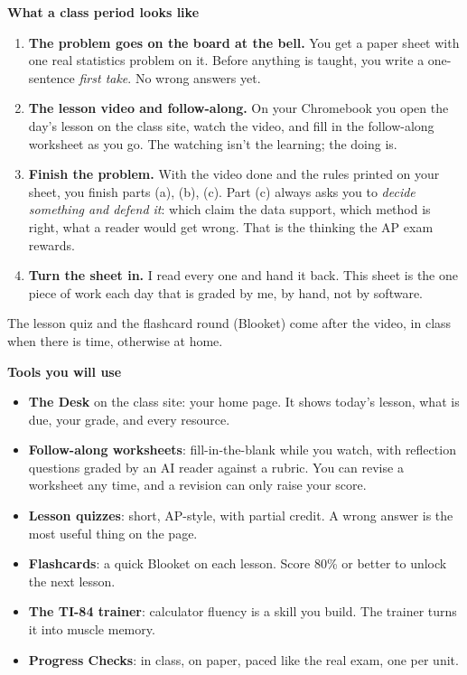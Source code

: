 \documentclass[10pt]{article}
\newcommand{\banner}[1]{%
  \vspace{4pt}\begin{tcolorbox}[enhanced, boxrule=0pt, arc=1pt, colback=dayblue, left=6pt, right=6pt, top=3pt, bottom=3pt]
  {\color{white}\bfseries\large #1}\end{tcolorbox}\vspace{-2pt}}
\begin{document}
\banner{What a class period looks like}
\begin{enumerate}[leftmargin=1.6em, itemsep=1pt, topsep=2pt]
  \item \textbf{The problem goes on the board at the bell.} You get a paper sheet with one real statistics problem on it.
        Before anything is taught, you write a one-sentence \emph{first take}. No wrong answers yet.
  \item \textbf{The lesson video and follow-along.} On your Chromebook you open the day's lesson on the class site, watch the
        video, and fill in the follow-along worksheet as you go. The watching isn't the learning; the doing is.
  \item \textbf{Finish the problem.} With the video done and the rules printed on your sheet, you finish parts (a), (b), (c).
        Part (c) always asks you to \emph{decide something and defend it}: which claim the data support, which method is
        right, what a reader would get wrong. That is the thinking the AP exam rewards.
  \item \textbf{Turn the sheet in.} I read every one and hand it back. This sheet is the one piece of work each day that is
        graded by me, by hand, not by software.
\end{enumerate}
The lesson quiz and the flashcard round (Blooket) come after the video, in class when there is time, otherwise at home.

\banner{Tools you will use}
\begin{itemize}[leftmargin=1.4em, itemsep=1pt, topsep=2pt]
  \item \textbf{The Desk} on the class site: your home page. It shows today's lesson, what is due, your grade, and every resource.
  \item \textbf{Follow-along worksheets}: fill-in-the-blank while you watch, with reflection questions graded by an AI reader
        against a rubric. You can revise a worksheet any time, and a revision can only raise your score.
  \item \textbf{Lesson quizzes}: short, AP-style, with partial credit. A wrong answer is the most useful thing on the page.
  \item \textbf{Flashcards}: a quick Blooket on each lesson. Score 80\% or better to unlock the next lesson.
  \item \textbf{The TI-84 trainer}: calculator fluency is a skill you build. The trainer turns it into muscle memory.
  \item \textbf{Progress Checks}: in class, on paper, paced like the real exam, one per unit.
\end{itemize}
\end{document}
